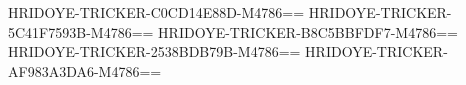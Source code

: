 HRIDOYE-TRICKER-C0CD14E88D-M4786==
HRIDOYE-TRICKER-5C41F7593B-M4786==
HRIDOYE-TRICKER-B8C5BBFDF7-M4786==
HRIDOYE-TRICKER-2538BDB79B-M4786==
HRIDOYE-TRICKER-AF983A3DA6-M4786==
